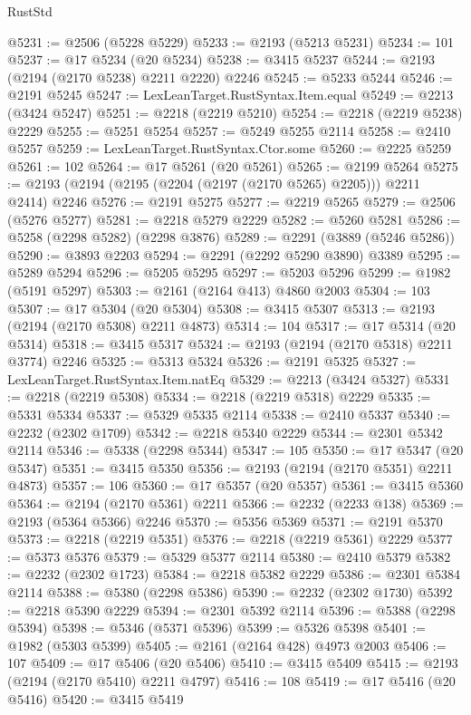 \begin{lexlean}{RustStd}
\begin{coremodule}
{\begin{coremodule}
{{{{{{{{{{{{{{{{{{{{{{{{{{@5231 := @2506 (@5228 @5229)
@5233 := @2193 (@5213 @5231)
@5234 := 101
@5237 := @17 @5234 (@20 @5234)
@5238 := @3415 @5237
@5244 := @2193 (@2194 (@2170 @5238) @2211 @2220) @2246
@5245 := @5233 @5244
@5246 := @2191 @5245
@5247 := LexLeanTarget.RustSyntax.Item.equal
@5249 := @2213 (@3424 @5247)
@5251 := @2218 (@2219 @5210)
@5254 := @2218 (@2219 @5238) @2229
@5255 := @5251 @5254
@5257 := @5249 @5255 @2114
@5258 := @2410 @5257
@5259 := LexLeanTarget.RustSyntax.Ctor.some
@5260 := @2225 @5259
@5261 := 102
@5264 := @17 @5261 (@20 @5261)
@5265 := @2199 @5264
@5275 := @2193 (@2194 (@2195 (@2204 (@2197 (@2170 @5265) @2205))) @2211 @2414) @2246
@5276 := @2191 @5275
@5277 := @2219 @5265
@5279 := @2506 (@5276 @5277)
@5281 := @2218 @5279 @2229
@5282 := @5260 @5281
@5286 := @5258 (@2298 @5282) (@2298 @3876)
@5289 := @2291 (@3889 (@5246 @5286))
@5290 := @3893 @2203
@5294 := @2291 (@2292 @5290 @3890) @3389
@5295 := @5289 @5294
@5296 := @5205 @5295
@5297 := @5203 @5296
@5299 := @1982 (@5191 @5297)
@5303 := @2161 (@2164 @413) @4860 @2003
@5304 := 103
@5307 := @17 @5304 (@20 @5304)
@5308 := @3415 @5307
@5313 := @2193 (@2194 (@2170 @5308) @2211 @4873)
@5314 := 104
@5317 := @17 @5314 (@20 @5314)
@5318 := @3415 @5317
@5324 := @2193 (@2194 (@2170 @5318) @2211 @3774) @2246
@5325 := @5313 @5324
@5326 := @2191 @5325
@5327 := LexLeanTarget.RustSyntax.Item.natEq
@5329 := @2213 (@3424 @5327)
@5331 := @2218 (@2219 @5308)
@5334 := @2218 (@2219 @5318) @2229
@5335 := @5331 @5334
@5337 := @5329 @5335 @2114
@5338 := @2410 @5337
@5340 := @2232 (@2302 @1709)
@5342 := @2218 @5340 @2229
@5344 := @2301 @5342 @2114
@5346 := @5338 (@2298 @5344)
@5347 := 105
@5350 := @17 @5347 (@20 @5347)
@5351 := @3415 @5350
@5356 := @2193 (@2194 (@2170 @5351) @2211 @4873)
@5357 := 106
@5360 := @17 @5357 (@20 @5357)
@5361 := @3415 @5360
@5364 := @2194 (@2170 @5361) @2211
@5366 := @2232 (@2233 @138)
@5369 := @2193 (@5364 @5366) @2246
@5370 := @5356 @5369
@5371 := @2191 @5370
@5373 := @2218 (@2219 @5351)
@5376 := @2218 (@2219 @5361) @2229
@5377 := @5373 @5376
@5379 := @5329 @5377 @2114
@5380 := @2410 @5379
@5382 := @2232 (@2302 @1723)
@5384 := @2218 @5382 @2229
@5386 := @2301 @5384 @2114
@5388 := @5380 (@2298 @5386)
@5390 := @2232 (@2302 @1730)
@5392 := @2218 @5390 @2229
@5394 := @2301 @5392 @2114
@5396 := @5388 (@2298 @5394)
@5398 := @5346 (@5371 @5396)
@5399 := @5326 @5398
@5401 := @1982 (@5303 @5399)
@5405 := @2161 (@2164 @428) @4973 @2003
@5406 := 107
@5409 := @17 @5406 (@20 @5406)
@5410 := @3415 @5409
@5415 := @2193 (@2194 (@2170 @5410) @2211 @4797)
@5416 := 108
@5419 := @17 @5416 (@20 @5416)
@5420 := @3415 @5419
}}}}}}}}}}}}}}}}}}}}}}}}}}
\end{coremodule}}
\end{coremodule}
\end{lexlean}

